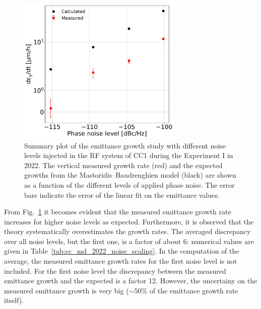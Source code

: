 \begin{figure}[!h]
   \centering         
   \includegraphics[width=0.7\textwidth]{images/Ch8/emit_V_background_subtracted_noise_scan_final.png}
       \caption{Summary plot of the emittance growth study with different noise levels injected in the RF system of CC1 during the Experiment I in 2022. The vertical measured growth rate (red) and the expected growths from the Mastoridis--Baudrenghien model (black) are shown as a function of the different levels of applied phase noise. The error bars indicate the error of the linear fit on the emittance values.}
       \label{fig:V_emit_growth_background_subtracted_noise_scan}
\end{figure}

From Fig.~\ref{fig:V_emit_growth_background_subtracted_noise_scan} it becomes evident that the measured emittance growth rate increases for higher noise levels as expected. Furthermore, it is observed that the theory systematically overestimates the growth rates. The averaged discrepancy over all noise levels, but the first one, is a factor of about 6: numerical values are given in Table~\ref{tab:cc_md_2022_noise_scaling}. In the computation of the average, the measured emittance growth rates for the first noise level is not included. For the first noise level the discrepancy between the measured emittance growth and the expected is a factor 12. However, the uncertainy on the measured emittance growth is very big ($\sim 50\%$ of the emittance growth rate itself).

